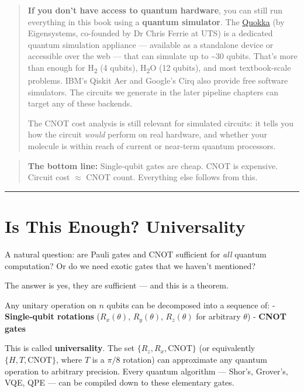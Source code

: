 \documentclass[
  11pt,
  oneside]{book}
\begin{document}
\begin{quote}
\textbf{If you don't have access to quantum hardware}, you can still run
everything in this book using a \textbf{quantum simulator}. The
\href{https://www.quokkacomputing.com/}{Quokka} (by Eigensystems,
co-founded by Dr Chris Ferrie at UTS) is a dedicated quantum simulation
appliance --- available as a standalone device or accessible over the
web --- that can simulate up to \textasciitilde30 qubits. That's more
than enough for H\textsubscript{2} (4 qubits), H\textsubscript{2}O (12 qubits), and most textbook-scale
problems. IBM's Qiskit Aer and Google's Cirq also provide free software
simulators. The circuits we generate in the later pipeline chapters can
target any of these backends.

The CNOT cost analysis is still relevant for simulated circuits: it
tells you how the circuit \emph{would} perform on real hardware, and
whether your molecule is within reach of current or near-term quantum
processors.
\end{quote}

\begin{quote}
\textbf{The bottom line:} Single-qubit gates are cheap. CNOT is
expensive. Circuit cost $\approx$ CNOT count. Everything else follows from this.
\end{quote}

\begin{center}\rule{0.5\linewidth}{0.5pt}\end{center}

\section{Is This Enough?
Universality}\label{is-this-enough-universality}

A natural question: are Pauli gates and CNOT sufficient for \emph{all}
quantum computation? Or do we need exotic gates that we haven't
mentioned?

The answer is yes, they are sufficient --- and this is a theorem.

Any unitary operation on \(n\) qubits can be decomposed into a sequence
of: - \textbf{Single-qubit rotations} (\(R_x(\theta)\), \(R_y(\theta)\),
\(R_z(\theta)\) for arbitrary \(\theta\)) - \textbf{CNOT gates}

This is called \textbf{universality}. The set
\(\{R_z, R_x, \text{CNOT}\}\) (or equivalently
\(\{H, T, \text{CNOT}\}\), where \(T\) is a \(\pi/8\) rotation) can
approximate any quantum operation to arbitrary precision. Every quantum
algorithm --- Shor's, Grover's, VQE, QPE --- can be compiled down to
these elementary gates.
\end{document}
